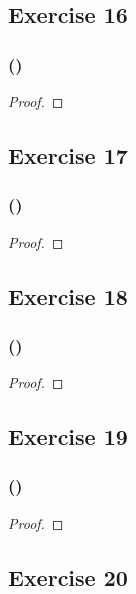 \documentclass[14pt]{extarticle}
\begin{document}
\subsection{Exercise 16}

\subsubsection{()}

\begin{proof}

\end{proof}

\subsection{Exercise 17}

\subsubsection{()}

\begin{proof}

\end{proof}

\subsection{Exercise 18}

\subsubsection{()}

\begin{proof}

\end{proof}

\subsection{Exercise 19}

\subsubsection{()}

\begin{proof}

\end{proof}

\subsection{Exercise 20}
\end{document}

